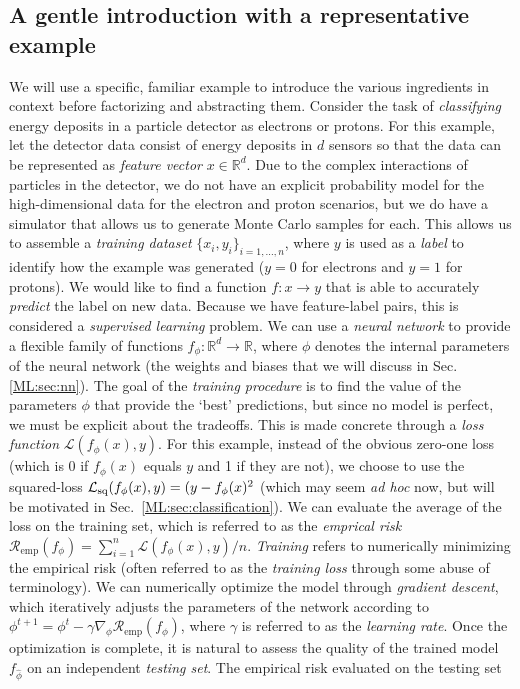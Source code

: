 
\subsection{A gentle introduction with a representative example}

We will use a specific, familiar example to introduce the various ingredients in context before factorizing and abstracting them. Consider the task of \textit{classifying} energy deposits in a particle detector as electrons or protons. For this example, let the detector data consist of energy deposits in $d$ sensors so that the data can be represented as \textit{feature vector} $x \in \mathbb{R}^d$. Due to the complex interactions of particles in the detector, we do not have an explicit probability model for the high-dimensional data for the electron and proton scenarios, but we do have a simulator that allows us to generate Monte Carlo samples for each. This allows us to assemble a \textit{training dataset} $\{x_i, y_i\}_{i=1,\dots,n}$, where $y$ is used as a \textit{label} to identify how the example was generated (\eg $y=0$ for electrons and $y=1$ for protons). We would like to find a function $f:x\to y$ that is able to accurately \textit{predict} the label on new data. Because we have feature-label pairs, this is considered a \textit{supervised learning} problem. We can use a \textit{neural network} to provide a flexible family of functions $f_\phi: \mathbb{R}^d \to \mathbb{R}$, where $\phi$ denotes the internal parameters of the neural network (\ie the weights and biases that we will discuss in Sec.\ref{ML:sec:nn}). The goal of the \textit{training procedure} is to find the value of the parameters $\phi$ that provide the `best' predictions, but since no model is perfect, we must be explicit about the tradeoffs. This is made concrete through a \textit{loss function} $\mathcal{L}(f_\phi(x),y)$. For this example, instead of the obvious zero-one loss (which is 0 if $f_\phi(x)$ equals $y$ and 1 if they are not), we  choose to use the squared-loss $\mathcal{L}_{\rm sq}(f_\phi(x), y) = (y - f_\phi(x)^2$ (which may seem \textit{ad hoc} now, but will be motivated in Sec.~\ref{ML:sec:classification}). We can evaluate the  average of the loss on the training set, which is referred to as the \textit{emprical risk} $\mathcal{R}_\textrm{emp}(f_\phi) = \sum_{i=1}^n \mathcal{L}(f_\phi(x), y)/n$. \textit{Training} refers to numerically minimizing the empirical risk (often referred to as the \textit{training loss} through some abuse of terminology). We can numerically optimize the model through \textit{gradient descent}, which iteratively adjusts the parameters of the network according to $\phi^{t+1} = \phi^t - \gamma \nabla_\phi \mathcal{R}_\textrm{emp}(f_\phi)$, where $\gamma$ is referred to as the \textit{learning rate}. Once the optimization is complete, it is natural to assess the quality of the trained model $f_{\hat\phi}$ on an independent \textit{testing set}. The empirical risk evaluated on the testing set 